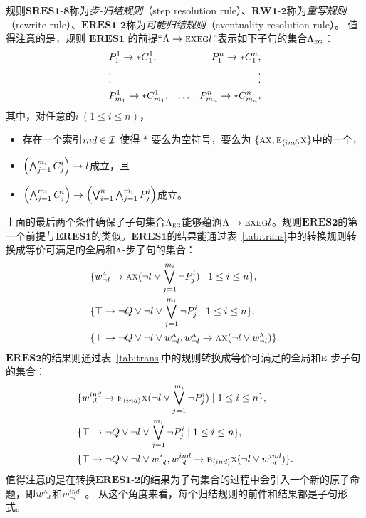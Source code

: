 规则$\textbf{SRES1-8}$称为\emph{步-归结规则}（step resolution rule）、$\textbf{RW1-2}$称为\emph{重写规则}（rewrite rule）、$\textbf{ERES1-2}$称为\emph{可能归结规则}（eventuality resolution rule）。
值得注意的是，规则 $\textbf{ERES1}$ 的前提“$\Lambda \rightarrow \textsc{e} \textsc{x} \textsc{e}\textsc{g} l$”表示如下子句的集合$\Lambda_{\textsc{e}\textsc{g}}$：
\begin{align*}
	& P_1^1\rightarrow *C_1^1, & & & P_1^n\rightarrow *C_1^n,\\
	& \vdots & && \vdots\\
	& P_{m_1}^1 \rightarrow * C_{m_1}^1, & \ldots && P_{m_n}^n\rightarrow *C_{m_n}^n,
\end{align*}
其中，对任意的$i~(1\le i\le n)$，
\begin{itemize}
	\item 存在一个索引$ind \in {\cal I}$ 使得 $*$ 要么为空符号，要么为 $\{\textsc{a}\textsc{x}, \textsc{e}_{{\langle{ind}\rangle}}\textsc{x}\}$中的一个，
	\item $\left(\bigwedge_{j=1}^{m_i} C_j^i\right) \rightarrow l$成立，且
	\item $\left(\bigwedge_{j=1}^{m_i} C_j^i\right) \rightarrow \left(\bigvee_{i=1}^n\bigwedge_{j=1}^{m_i} P_j^i\right)$成立。
\end{itemize}

上面的最后两个条件确保了子句集合$\Lambda_{\textsc{e}\textsc{g}}$能够蕴涵$\Lambda \rightarrow \textsc{e} \textsc{x} \textsc{e}\textsc{g} l$。规则$\textbf{ERES2}$的第一个前提与$\textbf{ERES1}$的类似。$\textbf{ERES1}$的结果能通过表~\ref{tab:trans}中的转换规则转换成等价可满足的全局和$\textsc{a}$-步子句的集合：
\begin{align*}
	& \{w_{\neg l}^{\textsc{a}} \rightarrow \textsc{a}\textsc{x}(\neg l \vee \bigvee_{j=1}^{m_i} \neg P_j^i) \mid 1 \leq i \leq n\},\\
	& \{\top \rightarrow \neg Q \vee \neg l \vee \bigvee_{j=1}^{m_i} \neg P_j^i \mid 1 \leq i \leq n\},\\
	& \{\top \rightarrow \neg Q \vee \neg l \vee w_{\neg l}^{\textsc{a}}, w_{\neg l}^{\textsc{a}} \rightarrow \textsc{a}\textsc{x}(\neg l \vee w_{\neg l}^{\textsc{a}})\}.
\end{align*}
$\textbf{ERES2}$的结果则通过表~\ref{tab:trans}中的规则转换成等价可满足的全局和$\textsc{e}$-步子句的集合：
\begin{align*}
	& \{w_{\neg l}^{ind} \rightarrow \textsc{e}_{{\langle{ind}\rangle}}\textsc{x}(\neg l \vee \bigvee_{j=1}^{m_i} \neg P_j^i) \mid 1 \leq i \leq n\},\\
	& \{\top \rightarrow \neg Q \vee \neg l \vee \bigvee_{j=1}^{m_i} \neg P_j^i \mid 1 \leq i \leq n\},\\
	& \{\top \rightarrow \neg Q \vee \neg l \vee w_{\neg l}^{\textsc{a}}, w_{\neg l}^{ind} \rightarrow \textsc{e}_{{\langle{ind}\rangle}}\textsc{x}(\neg l \vee w_{\neg l}^{ind})\}.
\end{align*}
值得注意的是在转换$\textbf{ERES1-2}$的结果为子句集合的过程中会引入一个新的原子命题，即$w_{\neg l}^{\textsc{a}}$和$w_{\neg l}^{ind}$~\cite{zhang2014resolution}。
从这个角度来看，每个归结规则的前件和结果都是子句形式。

